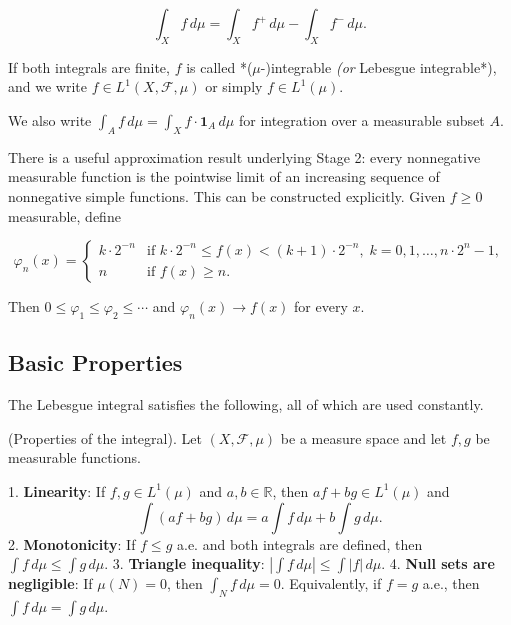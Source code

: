 \[
\int_X f \, d\mu = \int_X f^+ \, d\mu - \int_X f^- \, d\mu.
\]

If both integrals are finite, $f$ is called *($\mu$-)integrable\textit{ (or }Lebesgue integrable*), and we write $f \in L^1(X, \mathcal{F}, \mu)$ or simply $f \in L^1(\mu)$.

We also write $\int_A f \, d\mu = \int_X f \cdot \mathbf{1}_A \, d\mu$ for integration over a measurable subset $A$.

\begin{remark}
There is a useful approximation result underlying Stage 2: every nonnegative measurable function is the pointwise limit of an increasing sequence of nonnegative simple functions. This can be constructed explicitly. Given $f \geq 0$ measurable, define

\[
\varphi_n(x) = \begin{cases} k \cdot 2^{-n} & \text{if } k \cdot 2^{-n} \leq f(x) < (k+1) \cdot 2^{-n}, \; k = 0, 1, \ldots, n \cdot 2^n - 1, \\ n & \text{if } f(x) \geq n. \end{cases}
\]

Then $0 \leq \varphi_1 \leq \varphi_2 \leq \cdots$ and $\varphi_n(x) \to f(x)$ for every $x$.
\end{remark}


\subsection{Basic Properties}\label{sec:7.4.3}

The Lebesgue integral satisfies the following, all of which are used constantly.

\begin{proposition}\label{prop:7.21}
(Properties of the integral). Let $(X, \mathcal{F}, \mu)$ be a measure space and let $f, g$ be measurable functions.

1. \textbf{Linearity}: If $f, g \in L^1(\mu)$ and $a, b \in \mathbb{R}$, then $af + bg \in L^1(\mu)$ and
\[
\int (af + bg) \, d\mu = a \int f \, d\mu + b \int g \, d\mu.
\]
2. \textbf{Monotonicity}: If $f \leq g$ a.e. and both integrals are defined, then $\int f \, d\mu \leq \int g \, d\mu$.
3. \textbf{Triangle inequality}: $\left|\int f \, d\mu\right| \leq \int |f| \, d\mu$.
4. \textbf{Null sets are negligible}: If $\mu(N) = 0$, then $\int_N f \, d\mu = 0$. Equivalently, if $f = g$ a.e., then $\int f \, d\mu = \int g \, d\mu$.
\end{proposition}


